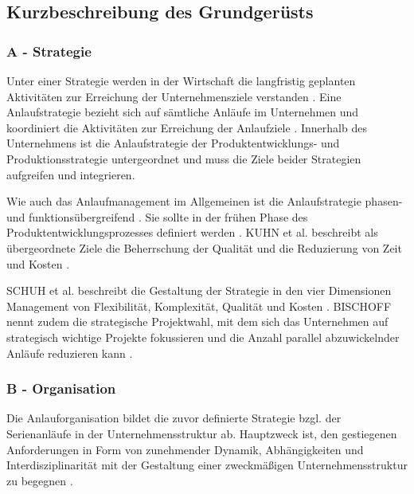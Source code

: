 \subsection*{Kurzbeschreibung des Grundgerüsts}

% 

\subsubsection*{A - Strategie}
Unter einer Strategie werden in der Wirtschaft die langfristig geplanten Aktivitäten zur Erreichung der Unternehmensziele verstanden \autocite[12]{Schuh2008}. %
% 
Eine Anlaufstrategie bezieht sich auf sämtliche Anläufe im Unternehmen und koordiniert die Aktivitäten zur Erreichung der Anlaufziele \autocite[4]{Schuh2008}. Innerhalb des Unternehmens ist die Anlaufstrategie der Pro\-dukt\-ent\-wicklungs- und Produktionsstrategie untergeordnet und muss die Ziele beider Strategien aufgreifen und integrieren. 
	

Wie auch das Anlaufmanagement im Allgemeinen ist die Anlaufstrategie phasen- und funktionsübergreifend \autocite{Pfohl2000}. 
Sie sollte in der frühen Phase des Produktentwicklungsprozesses definiert werden \autocite{Schuh2004}. 
KUHN et al. beschreibt als übergeordnete Ziele die Beherrschung der Qualität und die Reduzierung von Zeit und Kosten \autocite[4]{Kuhn2002}. 

SCHUH et al. beschreibt die Gestaltung der Strategie in den vier Dimensionen Management von Flexibilität, Komplexität, Qualität und Kosten \autocite[13]{Schuh2008}. BISCHOFF nennt zudem die strategische Projektwahl, mit dem sich das Unternehmen auf strategisch wichtige Projekte fokussieren und die Anzahl parallel abzuwickelnder Anläufe reduzieren kann \autocite[43]{Bischoff2007}. 

\subsubsection*{B - Organisation}
Die Anlauforganisation bildet die zuvor definierte Strategie bzgl. der Serienanläufe in der Unternehmensstruktur ab. Hauptzweck ist, den gestiegenen Anforderungen in Form von zunehmender Dynamik, Abhängigkeiten und Interdisziplinarität mit der Gestaltung einer zweckmäßigen Unternehmensstruktur zu begegnen \autocite[55]{Schuh2008}. 

